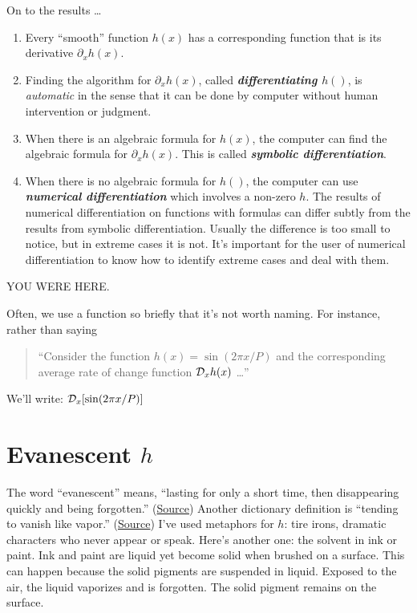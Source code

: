 \documentclass[
]{book}
\providecommand{\tightlist}{%
  \setlength{\itemsep}{0pt}\setlength{\parskip}{0pt}}
\begin{document}
On to the results \ldots{}

\begin{enumerate}
\def\labelenumi{\arabic{enumi}.}
\tightlist
\item
  Every ``smooth'' function \(h(x)\) has a corresponding function that is its derivative \(\partial_x h(x)\).
\item
  Finding the algorithm for \(\partial_x h(x)\), called \textbf{\emph{differentiating \(h()\)}}, is \emph{automatic} in the sense that it can be done by computer without human intervention or judgment.
\item
  When there is an algebraic formula for \(h(x)\), the computer can find the algebraic formula for \(\partial_x h(x)\). This is called \textbf{\emph{symbolic differentiation}}.
\item
  When there is no algebraic formula for \(h()\), the computer can use \textbf{\emph{numerical differentiation}} which involves a non-zero \(h\). The results of numerical differentiation on functions with formulas can differ subtly from the results from symbolic differentiation. Usually the difference is too small to notice, but in extreme cases it is not. It's important for the user of numerical differentiation to know how to identify extreme cases and deal with them.
\end{enumerate}

YOU WERE HERE.

Often, we use a function so briefly that it's not worth naming. For instance, rather than saying

\begin{quote}
``Consider the function \(h(x) = \sin(2\pi x/P)\) and the corresponding average rate of change function \({\cal D}_x h(x)\) \ldots{}''
\end{quote}

We'll write: \({\cal D}_x [\sin(2\pi x/P)]\)

\hypertarget{evanescent-h}{%
\section{\texorpdfstring{Evanescent \(h\)}{Evanescent h}}\label{evanescent-h}}

The word ``evanescent'' means, ``lasting for only a short time, then disappearing quickly and being forgotten.'' (\href{https://dictionary.cambridge.org/us/dictionary/english/evanescent}{Source}) Another dictionary definition is ``tending to vanish like vapor.'' (\href{https://www.merriam-webster.com/dictionary/evanescent}{Source}) I've used metaphors for \(h\): tire irons, dramatic characters who never appear or speak. Here's another one: the solvent in ink or paint. Ink and paint are liquid yet become solid when brushed on a surface. This can happen because the solid pigments are suspended in liquid. Exposed to the air, the liquid vaporizes and is forgotten. The solid pigment remains on the surface.
\end{document}
